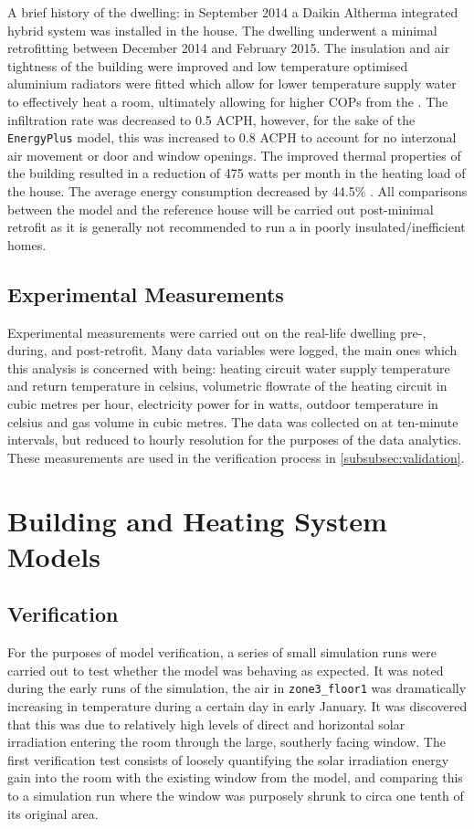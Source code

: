 A brief history of the dwelling: in September 2014 a Daikin Altherma integrated hybrid \HP system was installed in the house. The dwelling underwent a minimal retrofitting between December 2014 and February 2015. The insulation and air tightness of the building were improved and low temperature optimised aluminium radiators were fitted which allow for lower temperature supply water to effectively heat a room, ultimately allowing for higher \acp{COP} from the \HP. The infiltration rate was decreased to 0.5 \ac{ACPH}, however, for the sake of the \texttt{EnergyPlus} model, this was increased to 0.8 \ac{ACPH} to account for no interzonal air movement or door and window openings. The improved thermal properties of the building resulted in a reduction of 475 watts per month in the heating load of the house. The average energy consumption decreased by 44.5\% \cite{keogh_technical_2018}. All comparisons between the model and the reference house will be carried out post-minimal retrofit as it is generally not recommended to run a \HP in poorly insulated/inefficient homes.

\subsection{Experimental Measurements} \label{subsec:expmeasure}
Experimental measurements were carried out on the real-life dwelling pre-, during, and post-retrofit. Many data variables were logged, the main ones which this analysis is concerned with being: heating circuit water supply temperature and return temperature in celsius, volumetric flowrate of the heating circuit in cubic metres per hour, electricity power for \HP in watts, outdoor temperature in celsius and gas volume in cubic metres. The data was collected on at ten-minute intervals, but reduced to hourly resolution for the purposes of the data analytics. These measurements are used in the verification process in \cref{subsubsec:validation}.


\section{Building and Heating System Models}\label{sec:methodheatingsys}



\subsection{Verification} \label{subsubsec:verification}
For the purposes of model verification, a series of small simulation runs were carried out to test whether the model was behaving as expected. It was noted during the early runs of the simulation, the air in \texttt{zone3\_floor1} was dramatically increasing in temperature during a certain day in early January. It was discovered that this was due to relatively high levels of direct and horizontal solar irradiation entering the room through the large, southerly facing window. The first verification test consists of loosely quantifying the solar irradiation energy gain into the room with the existing window from the model, and comparing this to a simulation run where the window was purposely shrunk to circa one tenth of its original area. 

